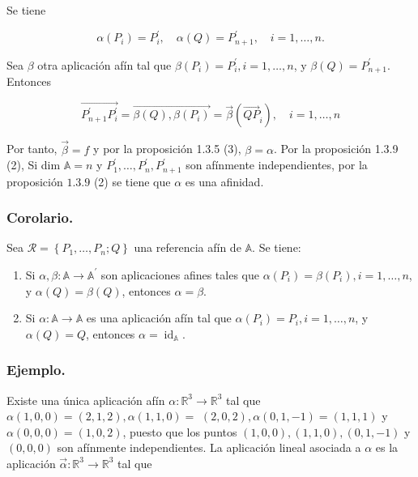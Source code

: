 \documentclass[12pt, a4paper, ones, notitlepage, openany,titlepage]{article}
\begin{document}
Se tiene

$$
\alpha\left(P_{i}\right)=P_{i}^{\prime}, \quad \alpha(Q)=P_{n+1}^{\prime}, \quad i=1, \ldots, n .
$$

Sea $\beta$ otra aplicación afín tal que $\beta\left(P_{i}\right)=P_{i}^{\prime}, i=1, \ldots, n$, y $\beta(Q)=P_{n+1}^{\prime}$. Entonces

$$
\overrightarrow{P_{n+1}^{\prime} P_{i}^{\prime}}=\overrightarrow{\beta(Q), \beta\left(P_{i}\right)}=\vec{\beta}\left(\overrightarrow{Q P}_{i}\right), \quad i=1, \ldots, n
$$

Por tanto, $\vec{\beta}=f$ y por la proposición 1.3.5 (3), $\beta=\alpha$. Por la proposición 1.3.9 (2), Si dim $\mathbb{A}=n$ y $P_{1}^{\prime}, \ldots, P_{n}^{\prime}, P_{n+1}^{\prime}$ son afínmente independientes, por la proposición $1.3 .9$ (2) se tiene que $\alpha$ es una afinidad.

\subsubsection{Corolario.} Sea $\mathcal{R}=\left\{P_{1}, \ldots, P_{n} ; Q\right\}$ una referencia afín de $\mathbb{A}$. Se tiene:

\begin{enumerate}

\item Si $\alpha, \beta: \mathbb{A} \rightarrow \mathbb{A}^{\prime}$ son aplicaciones afines tales que $\alpha\left(P_{i}\right)=\beta\left(P_{i}\right), i=1, \ldots, n$, y $\alpha(Q)=\beta(Q)$, entonces $\alpha=\beta$.

\item Si $\alpha: \mathbb{A} \rightarrow \mathbb{A}$ es una aplicación afín tal que $\alpha\left(P_{i}\right)=P_{i}, i=1, \ldots, n$, y $\alpha(Q)=Q$, entonces $\alpha=\operatorname{id}_{\mathbb{A}}$.

\end{enumerate}

\subsubsection{Ejemplo.} Existe una única aplicación afín $\alpha: \mathbb{R}^{3} \rightarrow \mathbb{R}^{3}$ tal que $\alpha(1,0,0)=(2,1,2), \alpha(1,1,0)=$ $(2,0,2), \alpha(0,1,-1)=(1,1,1)$ y $\alpha(0,0,0)=(1,0,2)$, puesto que los puntos $(1,0,0),(1,1,0),(0,1,-1)$ y $(0,0,0)$ son afínmente independientes. La aplicación lineal asociada a $\alpha$ es la aplicación $\vec{\alpha}: \mathbb{R}^{3} \rightarrow \mathbb{R}^{3}$ tal que
\end{document}
